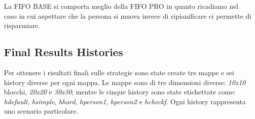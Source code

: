 La FIFO BASE si comporta meglio della FIFO PRO in quanto ricadiamo nel caso in cui aspettare che la persona si muova invece di ripianificare ci permette di risparmiare.

\subsection{Final Results Histories}

Per ottenere i risultati finali sulle strategie sono state create tre mappe e sei history diverse per ogni mappa. Le mappe sono di tre dimensioni diverse: \emph{10x10} blocchi, \emph{20x20} e \emph{30x30}; mentre le cinque history sono state etichettate come: \emph{hdefault}, \emph{hsimple}, \emph{hhard}, \emph{hperson1}, \emph{hperson2} e \emph{hcheckf}. Ogni history rappresenta uno scenario particolare.

